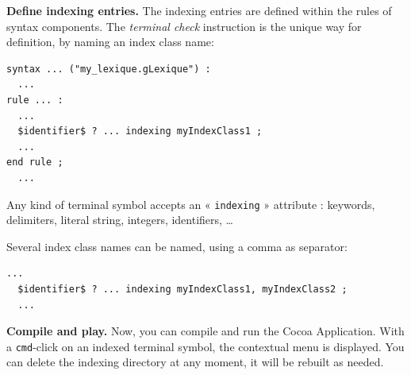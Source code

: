 \noindent{} \textbf{Define indexing entries.} The indexing entries are defined within the rules of syntax components. The \emph{terminal check} instruction is the unique way for definition, by naming an index class name:

\begin{lstlisting}[language=galgas]
syntax ... ("my_lexique.gLexique") :
  ...
rule ... :
  ...
  $identifier$ ? ... indexing myIndexClass1 ;
  ...
end rule ;
  ...
\end{lstlisting}

Any kind of terminal symbol accepts an « \texttt{indexing} » attribute : keywords, delimiters, literal string, integers, identifiers, \dots

Several index class names can be named, using a comma as separator:
\begin{lstlisting}[language=galgas]
  ...
  $identifier$ ? ... indexing myIndexClass1, myIndexClass2 ;
  ...
\end{lstlisting}






\noindent{} \textbf{Compile and play.} Now, you can compile and run the Cocoa Application. With a \texttt{cmd}-click on an indexed terminal symbol, the contextual menu is displayed. You can delete the indexing directory at any moment, it will be rebuilt as needed.







